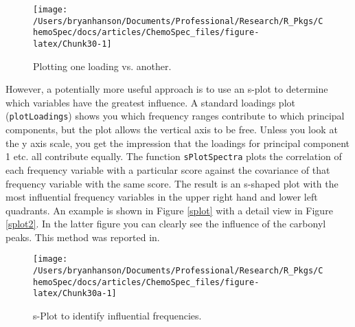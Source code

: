 \documentclass[letter,10pt,twocolumn,twoside,printwatermark=false]{pinp}
\begin{document}
\begin{figure}

{\centering \texttt{[image: /Users/bryanhanson/Documents/Professional/Research/R\_Pkgs/ChemoSpec/docs/articles/ChemoSpec\_files/figure-latex/Chunk30-1]} 

}

\caption{\label{load2}Plotting one loading vs. another.}\label{fig:Chunk30}
\end{figure}

However, a potentially more useful approach is to use an s-plot to
determine which variables have the greatest influence. A standard
loadings plot (\texttt{plotLoadings}) shows you which frequency ranges
contribute to which principal components, but the plot allows the
vertical axis to be free. Unless you look at the y axis scale, you get
the impression that the loadings for principal component 1 etc. all
contribute equally. The function \texttt{sPlotSpectra} plots the
correlation of each frequency variable with a particular score against
the covariance of that frequency variable with the same score. The
result is an s-shaped plot with the most influential frequency variables
in the upper right hand and lower left quadrants. An example is shown in
Figure \ref{splot} with a detail view in Figure \ref{splot2}. In the
latter figure you can clearly see the influence of the carbonyl peaks.
This method was reported in\cite{Wiklund2008}.

\begin{Shaded}
\begin{Highlighting}[]
\StringTok{ }
   \NormalTok{,}
   \NormalTok{)}
\end{Highlighting}
\end{Shaded}

\begin{figure}

{\centering \texttt{[image: /Users/bryanhanson/Documents/Professional/Research/R\_Pkgs/ChemoSpec/docs/articles/ChemoSpec\_files/figure-latex/Chunk30a-1]} 

}

\caption{\label{splot}s-Plot to identify influential frequencies.}\label{fig:Chunk30a}
\end{figure}

\begin{Shaded}
\begin{Highlighting}[]
\StringTok{ }
   \NormalTok{,}
   \NormalTok{,}
   \NormalTok{,}
   \NormalTok{(}\OperatorTok{-}\NormalTok{, }\NormalTok{),}
   \NormalTok{(}\OperatorTok{-}\NormalTok{, }\NormalTok{))}
\end{Highlighting}
\end{Shaded}
\end{document}
